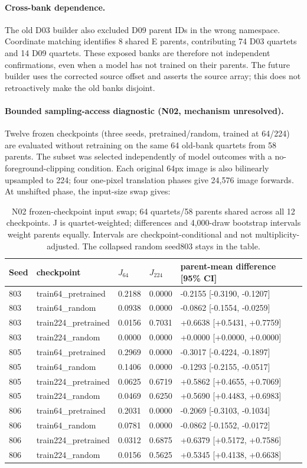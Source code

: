 \paragraph{Cross-bank dependence.} The old D03 builder also excluded D09 parent IDs in the wrong namespace. Coordinate matching identifies 8 shared E parents, contributing 74 D03 quartets and 14 D09 quartets. These exposed banks are therefore not independent confirmations, even when a model has not trained on their parents. The future builder uses the corrected source offset and asserts the source array; this does not retroactively make the old banks disjoint.
\paragraph{Bounded sampling-access diagnostic (N02, mechanism unresolved).} Twelve frozen checkpoints (three seeds, pretrained/random, trained at 64/224) are evaluated without retraining on the same 64 old-bank quartets from 58 parents. The subset was selected independently of model outcomes with a no-foreground-clipping condition. Each original 64px image is also bilinearly upsampled to 224; four one-pixel translation phases give 24,576 image forwards. At unshifted phase, the input-size swap gives:
\begin{table}[t]\centering\small\begin{tabular}{@{}lllll@{}}\toprule
Seed & checkpoint & $J_{64}$ & $J_{224}$ & parent-mean difference [95\% CI] \\
\midrule
803 & train64\_pretrained & 0.2188 & 0.0000 & -0.2155 [-0.3190, -0.1207] \\
803 & train64\_random & 0.0938 & 0.0000 & -0.0862 [-0.1554, -0.0259] \\
803 & train224\_pretrained & 0.0156 & 0.7031 & +0.6638 [+0.5431, +0.7759] \\
803 & train224\_random & 0.0000 & 0.0000 & +0.0000 [+0.0000, +0.0000] \\
805 & train64\_pretrained & 0.2969 & 0.0000 & -0.3017 [-0.4224, -0.1897] \\
805 & train64\_random & 0.1406 & 0.0000 & -0.1293 [-0.2155, -0.0517] \\
805 & train224\_pretrained & 0.0625 & 0.6719 & +0.5862 [+0.4655, +0.7069] \\
805 & train224\_random & 0.0469 & 0.6250 & +0.5690 [+0.4483, +0.6983] \\
806 & train64\_pretrained & 0.2031 & 0.0000 & -0.2069 [-0.3103, -0.1034] \\
806 & train64\_random & 0.0781 & 0.0000 & -0.0862 [-0.1552, -0.0172] \\
806 & train224\_pretrained & 0.0312 & 0.6875 & +0.6379 [+0.5172, +0.7586] \\
806 & train224\_random & 0.0156 & 0.5625 & +0.5345 [+0.4138, +0.6638] \\
\bottomrule\end{tabular}\caption{N02 frozen-checkpoint input swap; 64 quartets/58 parents shared across all 12 checkpoints. J is quartet-weighted; differences and 4,000-draw bootstrap intervals weight parents equally. Intervals are checkpoint-conditional and not multiplicity-adjusted. The collapsed random seed803 stays in the table.}\end{table}
